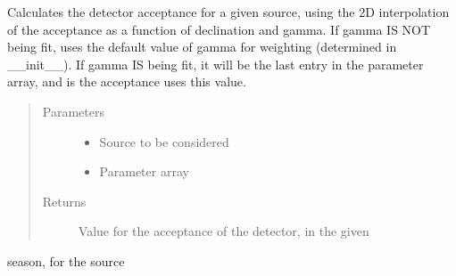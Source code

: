 \documentclass[letterpaper,10pt,english]{sphinxmanual}
\begin{document}
\begin{fulllineitems}
\begin{fulllineitems}
\label{\detokenize{index:flarestack.core.llh.StandardLLH.new_acceptance}}
Calculates the detector acceptance for a given source, using the
2D interpolation of the acceptance as a function of declination and
gamma. If gamma IS NOT being fit, uses the default value of gamma for
weighting (determined in \_\_init\_\_). If gamma IS being fit, it will be
the last entry in the parameter array, and is the acceptance uses
this value.
\begin{quote}\begin{description}
\item[{Parameters}] \leavevmode\begin{itemize}
\item {} 
 \textendash{} Source to be considered

\item {} 
 \textendash{} Parameter array

\end{itemize}

\item[{Returns}] \leavevmode
Value for the acceptance of the detector, in the given

\end{description}\end{quote}

season, for the source

\end{fulllineitems}


\begin{fulllineitems}
\label{\detokenize{index:flarestack.core.llh.StandardLLH.return_injected_parameters}}
\end{fulllineitems}


\begin{fulllineitems}
\label{\detokenize{index:flarestack.core.llh.StandardLLH.return_llh_parameters}}
\end{fulllineitems}


\end{fulllineitems}
\end{document}
